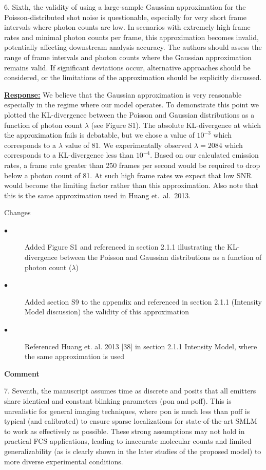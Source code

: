 \documentclass{article}
\begin{document}
6.	Sixth, the validity of using a large-sample Gaussian approximation for the 
Poisson-distributed shot noise is questionable, especially for very short frame 
intervals where photon counts are low. In scenarios with extremely high frame 
rates and minimal photon counts per frame, this approximation becomes invalid, 
potentially affecting downstream analysis accuracy. The authors should assess the 
range of frame intervals and photon counts where the Gaussian approximation remains valid. 
If significant deviations occur, alternative approaches should be considered, or the 
limitations of the approximation should be explicitly discussed. 

\underline{\textbf{Response:}}
We believe that the Gaussian approximation is very reasonable especially in the regime where our model operates. 
To demonstrate this point we plotted the KL-divergence between the Poisson and Gaussian distributions 
as a function of photon count $\lambda$ (see Figure S1). The absolute KL-divergence at which the approximation fails 
is debatable, but we chose a value of $10^{-3}$ which corresponds to a $\lambda$ value of 81. We experimentally 
observed $\lambda=2084$ which corresponds to a KL-divergence less than $10^{-4}$.
%
Based on our calculated emission rates, a frame rate greater than 250 frames
per second would be required to drop below a photon count of 81. At such high
frame rates we expect that low SNR would become the limiting factor rather than
this approximation. Also note that this is the same approximation used in Huang
et.\ al.\ 2013.

Changes
\begin{description}
    \item[$\bullet$] Added Figure S1 and referenced in section 2.1.1 illustrating the KL-divergence between 
    the Poisson and Gaussian distributions as a function of photon count ($\lambda$)
    \item[$\bullet$] Added section S9 to the appendix and referenced in section 2.1.1 (Intensity Model discussion) the validity of this 
    approximation
    \item[$\bullet$] Referenced Huang et. al. 2013 [38] in section 2.1.1 Intensity Model, where the same 
    approximation is used
\end{description}

\textbf{Comment}

7.	Seventh, the manuscript assumes time as discrete and posits that all 
emitters share identical and constant blinking parameters (pon and poff). 
This is unrealistic for general imaging techniques, where pon is much less than poff is 
typical (and calibrated) to ensure sparse localizations for state-of-the-art 
SMLM to work as effectively as possible. These strong assumptions may not hold 
in practical FCS applications, leading to inaccurate molecular counts and limited 
generalizability (as is clearly shown in the later studies of the proposed model) 
to more diverse experimental conditions.
\end{document}
